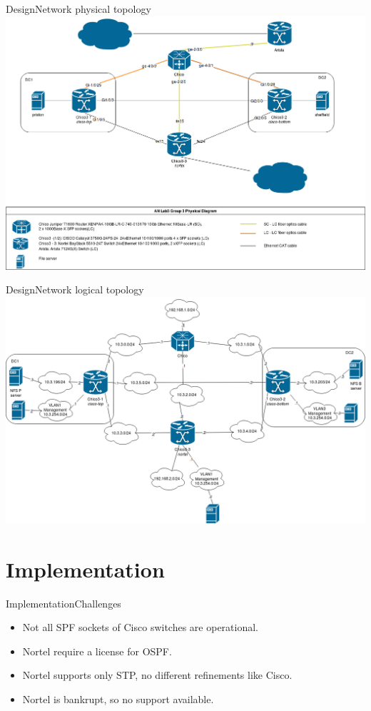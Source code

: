 \documentclass{beamer}
\begin{document}
\begin{frame}{Design}{Network physical topology}
\includegraphics[width=\textwidth]{ANLab3Group3PhysicalDia.png}
\end{frame}

\begin{frame}{Design}{Network logical topology}
\includegraphics[width=\textwidth]{ANLab3Group3LogicalDia.png}
\end{frame}

\section{Implementation}
\begin{frame}{Implementation}{Challenges}
\begin{itemize}
    \item Not all SPF sockets of Cisco switches are operational.
    \item Nortel require a license for OSPF.
    \item Nortel supports only STP, no different refinements like Cisco.
    \item Nortel is bankrupt, so no support available.
\end{itemize}
\end{frame}
\end{document}
